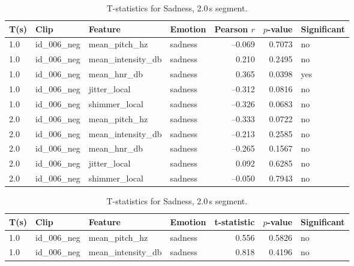   \begin{table}[ht]
    \centering
    \begin{subtable}[t]{0.48\textwidth}
      \centering
      \caption{Pearson correlations for Sadness, 2.0\,s segment.}
      \label{tab:pearson_sadness_2s}
      \begin{tabular}{l l l l r r l}
        \toprule
        T(s) & Clip           & Feature             & Emotion & Pearson $r$ & $p$-value & Significant \\
        \midrule
        1.0 & id\_006\_neg & mean\_pitch\_hz     & sadness & –0.069 & 0.7073 & no  \\
      1.0 & id\_006\_neg & mean\_intensity\_db & sadness &  0.210 & 0.2495 & no  \\
      1.0 & id\_006\_neg & mean\_hnr\_db       & sadness &  0.365 & 0.0398 & yes \\
      1.0 & id\_006\_neg & jitter\_local       & sadness & –0.312 & 0.0816 & no  \\
      1.0 & id\_006\_neg & shimmer\_local      & sadness & –0.326 & 0.0683 & no  \\
        2.0 & id\_006\_neg & mean\_pitch\_hz     & sadness & –0.333 & 0.0722 & no \\
        2.0 & id\_006\_neg & mean\_intensity\_db & sadness & –0.213 & 0.2585 & no \\
        2.0 & id\_006\_neg & mean\_hnr\_db       & sadness & –0.265 & 0.1567 & no \\
        2.0 & id\_006\_neg & jitter\_local       & sadness &  0.092 & 0.6285 & no \\
        2.0 & id\_006\_neg & shimmer\_local      & sadness & –0.050 & 0.7943 & no \\
        \bottomrule
      \end{tabular}
    \end{subtable}%
    \hfill
    \begin{subtable}[t]{0.48\textwidth}
      \centering
      \caption{T-statistics for Sadness, 2.0\,s segment.}
      \label{tab:ttest_sadness_2s}
      \begin{tabular}{l l l l r r l}
        \toprule
        T(s) & Clip           & Feature             & Emotion & t-statistic & $p$-value & Significant \\
        \midrule
        1.0 & id\_006\_neg & mean\_pitch\_hz     & sadness &  0.556 & 0.5826 & no  \\
      1.0 & id\_006\_neg & mean\_intensity\_db & sadness &  0.818 & 0.4196 & no  \\

\end{tabular}
\end{subtable}
\end{table}
